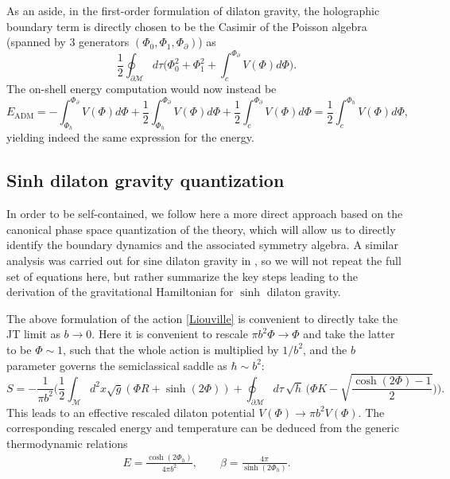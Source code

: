 \documentclass[a4paper,titlepage,12pt]{article}
\numberwithin{equation}{section}
\begin{document}
As an aside, in the first-order formulation of dilaton gravity, the holographic boundary term is directly chosen to be the Casimir of the Poisson algebra (spanned by 3 generators $(\Phi_0,\Phi_1,\Phi_\partial)$) as 
\begin{equation}
\frac{1}{2}\oint_{\partial \mathcal{M}} d\tau \bigg(\Phi_0^2+\Phi_1^2 + \int^{\Phi_{\partial}}_c V(\Phi) d\Phi\bigg).
\end{equation}
The on-shell energy computation would now instead be
\begin{equation}
E_{\text{ADM}} = - \int^{\Phi_{\partial}}_{\Phi_h} V(\Phi) d\Phi + \frac{1}{2}\int^{\Phi_{\partial}}_{\Phi_h} V(\Phi) d\Phi + \frac{1}{2} \int^{\Phi_{\partial}}_c V(\Phi) d\Phi  = \frac{1}{2}\int^{\Phi_h}_{c}V(\Phi)d\Phi,
\end{equation}
yielding indeed the same expression for the energy.

\subsection{Sinh dilaton gravity quantization}
\label{a:quant}
In order to be self-contained, we follow here a more direct approach based on the canonical phase space quantization of the theory, which will allow us to directly identify the boundary dynamics and the associated symmetry algebra. A similar analysis was carried out for sine dilaton gravity in \cite{Blommaert:2024ymv,Blommaert:2024whf}, so we will not repeat the full set of equations here, but rather summarize the key steps leading to the derivation of the gravitational Hamiltonian for $\sinh$ dilaton gravity. 

The above formulation of the action \eqref{Liouville} is convenient to directly take the JT limit as $b\rightarrow0$. Here it is convenient to rescale $\pi b^2\Phi\rightarrow \Phi$ and take the latter to be $\Phi\sim 1$, such that the whole action is multiplied by $1/b^2$, and the $b$ parameter governs the semiclassical saddle as $\hbar\sim  b^2$: 
\begin{equation}
\label{scaledLiouville}
S = -\frac{1}{\pi b^2}\bigg( \frac{1}{2}\int_\mathcal{M} d^2x \sqrt{g}\left(\Phi R + \sinh (2 \Phi)\right) + \oint_{\partial \mathcal{M}} d \tau\,\sqrt{h}\,\bigg(\Phi K-\sqrt{\frac{\cosh(2 \Phi)-1}{2}}\bigg)\bigg).
\end{equation} 
This leads to an effective rescaled dilaton potential $V(\Phi)\rightarrow \pi b^2 V(\Phi)$. The corresponding rescaled energy and temperature can be deduced from the generic thermodynamic relations
\begin{align}
    E= \frac{\cosh(2 \Phi_h)}{4 \pi b^2}, \qquad \beta=\frac{4\pi}{\sinh(2\Phi_h)}.
\end{align}
\end{document}
